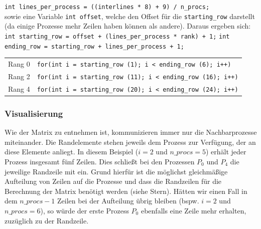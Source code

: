 \documentclass[12pt]{article}
\begin{document}
\begin{sloppypar}
\verb|int lines_per_process = ((interlines * 8) + 9) / n_procs;| \\

sowie eine Variable \verb|int offset|, welche den Offset für die \verb|starting_row| darstellt (da einige Prozesse mehr Zeilen haben können als andere). Daraus ergeben sich: \\

\verb|int starting_row = offset + (lines_per_process * rank) + 1;|
\verb|int ending_row = starting_row + lines_per_process + 1;|

\begin{center}
    \vspace*{0.5em}
    \begin{tabular*}{\textwidth}[ht]{r|l}
        Rang 0 & \verb|for(int i = starting_row (1); i < ending_row (6); i++)| \\
        Rang 2 & \verb|for(int i = starting_row (11); i < ending_row (16); i++)| \\
        Rang 4 & \verb|for(int i = starting_row (20); i < ending_row (24); i++)| \\
    \end{tabular*}
\end{center}

\newpage
\subsubsection*{Visualisierung}

Wie der Matrix zu entnehmen ist, kommunizieren immer nur die Nachbarprozesse miteinander.
Die Randelemente stehen jeweils dem Prozess zur Verfügung, der an diese Elemente anliegt.
In diesem Beispiel ($i=2$ und $n\_procs=5$) erhält jeder Prozess insgesamt fünf Zeilen. Dies schließt bei den Prozessen $P_0$ und $P_4$ die jeweilige Randzeile mit ein. Grund hierfür ist die möglichst gleichmäßige Aufteilung von Zeilen auf die Prozesse und dass die Randzeilen für die Berechnung der Matrix benötigt werden (siehe Stern).
Hätten wir einen Fall in dem $n\_procs - 1$ Zeilen bei der Aufteilung übrig bleiben (bspw. $i=2$ und $n\_procs=6$), so würde der erste Prozess $P_0$ ebenfalls eine Zeile mehr erhalten, zuzüglich zu der Randzeile.


\end{sloppypar}
\end{document}
